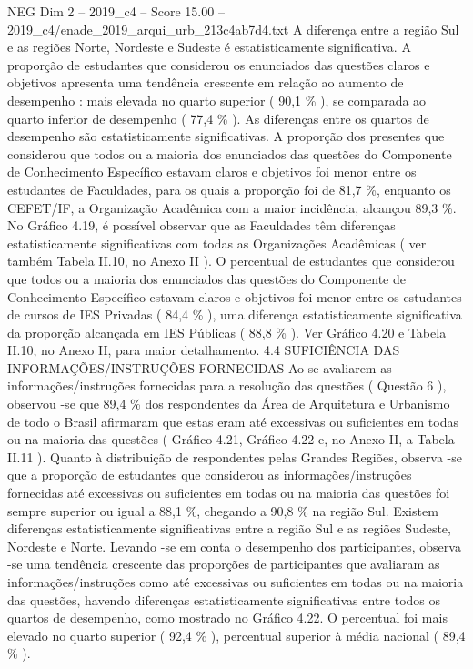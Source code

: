 \begin{textsample}{NEG Dim 2 – 2019\_c4 – Score 15.00 – 2019\_c4/enade\_2019\_arqui\_urb\_213c4ab7d4.txt}
A diferença entre a região Sul e as regiões Norte, Nordeste e Sudeste é estatisticamente significativa.
A proporção de estudantes que considerou os enunciados das questões claros e objetivos apresenta uma tendência crescente em relação ao aumento de desempenho : mais elevada no quarto superior ( 90,1 \% ), se comparada ao quarto inferior de desempenho ( 77,4 \% ).
As diferenças entre os quartos de desempenho são estatisticamente significativas.
A proporção dos presentes que considerou que todos ou a maioria dos enunciados das questões do Componente de Conhecimento Específico estavam claros e objetivos foi menor entre os estudantes de Faculdades, para os quais a proporção foi de 81,7 \%, enquanto os CEFET/IF, a Organização Acadêmica com a maior incidência, alcançou 89,3 \%.
No Gráfico 4.19, é possível observar que as Faculdades têm diferenças estatisticamente significativas com todas as Organizações Acadêmicas ( ver também Tabela II.10, no Anexo II ).
O percentual de estudantes que considerou que todos ou a maioria dos enunciados das questões do Componente de Conhecimento Específico estavam claros e objetivos foi menor entre os estudantes de cursos de IES Privadas ( 84,4 \% ), uma diferença estatisticamente significativa da proporção alcançada em IES Públicas ( 88,8 \% ).
Ver Gráfico 4.20 e Tabela II.10, no Anexo II, para maior detalhamento. 4.4 SUFICIÊNCIA DAS INFORMAÇÕES/INSTRUÇÕES FORNECIDAS Ao se avaliarem as informações/instruções fornecidas para a resolução das questões ( Questão 6 ), observou -se que 89,4 \% dos respondentes da Área de Arquitetura e Urbanismo de todo o Brasil afirmaram que estas eram até excessivas ou suficientes em todas ou na maioria das questões ( Gráfico 4.21, Gráfico 4.22 e, no Anexo II, a Tabela II.11 ).
Quanto à distribuição de respondentes pelas Grandes Regiões, observa -se que a proporção de estudantes que considerou as informações/instruções fornecidas até excessivas ou suficientes em todas ou na maioria das questões foi sempre superior ou igual a 88,1 \%, chegando a 90,8 \% na região Sul.
Existem diferenças estatisticamente significativas entre a região Sul e as regiões Sudeste, Nordeste e Norte.
Levando -se em conta o desempenho dos participantes, observa -se uma tendência crescente das proporções de participantes que avaliaram as informações/instruções como até excessivas ou suficientes em todas ou na maioria das questões, havendo diferenças estatisticamente significativas entre todos os quartos de desempenho, como mostrado no Gráfico 4.22.
O percentual foi mais elevado no quarto superior ( 92,4 \% ), percentual superior à média nacional ( 89,4 \% ).

\end{textsample}
